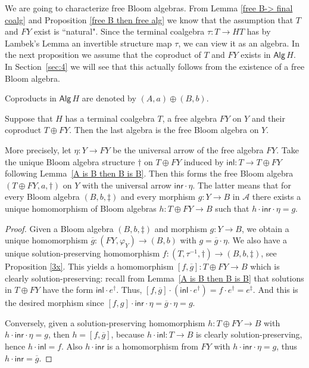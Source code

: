 \documentclass{LMCS}
\theoremstyle{plain}
\theoremstyle{definition}
\numberwithin{equation}{section}
\begin{document}
We are going to characterize free Bloom algebras. From Lemma \ref{free B-> final coalg} and Proposition \ref{free B then free alg}
we know that the assumption that $T$ and $FY$ exist is ``natural". Since the terminal coalgebra $\tau:T\rightarrow HT$ has by Lambek's Lemma an invertible structure map $\tau $, we can view it as an algebra. In the next proposition we assume that the coproduct of $T$ and $FY$ exists in $\mathsf{Alg}\, H$. In Section~\ref{sec:4} we will see that this actually follows from the existence of a free Bloom algebra.

\begin{nota}
Coproducts in $\mathsf{Alg}\, H$ are denoted by $(A,a)\oplus(B,b)$.
\end{nota}

\begin{thm}\label{thm:3.16}
Suppose that $H$ has a terminal coalgebra $T$, a free algebra $FY$ on $Y$ and their coproduct $T\oplus FY$. Then the last algebra is the free Bloom algebra on $Y$.
\end{thm}
\begin{rem}
  More precisely, let $\eta: Y \to FY$ be the universal arrow of the free algebra $FY$. Take the unique Bloom algebra structure $\dagger$ on $T \oplus FY$ induced by $\mathsf{inl}:T\rightarrow T\oplus FY$ following Lemma~\ref{A is B then B is B}.  Then this forms the free Bloom algebra $(T \oplus FY, a, \dagger)$ on $Y$ with the universal arrow $\mathsf{inr}\cdot\eta$.  The latter means that for every Bloom algebra $(B,b,\ddagger)$ and every morphism $g: Y \to B$ in $\mathcal A$ there exists a unique homomorphism of Bloom algebras $h: T\oplus FY \to B$ such that $h \cdot \mathsf{inr}\cdot\eta = g$. 
\end{rem}
\begin{proof}
Given a Bloom algebra $(B,b,\ddag)$ and morphism $g:Y\rightarrow B$, we obtain a unique homomorphism $\overline g:(FY,\varphi_Y)\rightarrow (B,b)$ with $g=\overline g\cdot\eta$. We also have a unique solution-preserving homomorphism $f:(T,\tau^{-1},\dagger)\rightarrow (B,b,\ddag)$, see Proposition \ref{3x}. This yields a homomorphism $[f,\overline g]:T\oplus FY\rightarrow B$ which is clearly solution-preserving: recall from Lemma~\ref{A is B then B is B} that solutions in $T\oplus FY$ have the form $\mathsf{inl}\cdot e^\dagger$. Thus, $[f,\overline g]\cdot(\mathsf{inl}\cdot e^\dagger)=f\cdot e^\dagger=e^\ddag.$ And this is the desired morphism since $[f,g]\cdot \mathsf{inr}\cdot\eta=\overline g\cdot\eta=g$.

Conversely, given a solution-preserving homomorphism $h:T\oplus FY\rightarrow B$ with $h\cdot\mathsf{inr}\cdot\eta=g$, then $h=[f,\overline g]$, because $h\cdot\mathsf{inl}:T\rightarrow B$ is clearly solution-preserving, hence $h\cdot\mathsf{inl}=f$. Also $h\cdot\mathsf{inr}$ is a homomorphism from $FY$ with $h\cdot\mathsf{inr}\cdot\eta=g$, thus $h\cdot\mathsf{inr}=\overline g$.
\end{proof}
\end{document}
